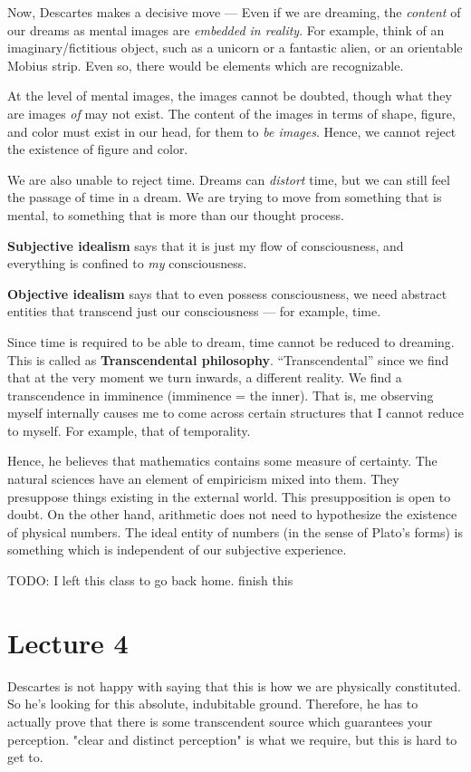 \documentclass[11pt]{book}
\begin{document}
Now, Descartes makes a decisive move --- Even if we are dreaming,
the \textit{content} of our dreams as mental images are
\textit{embedded in reality}.
For example, think of an imaginary/fictitious object, such
as a unicorn or a fantastic alien, or an orientable Mobius strip.
Even so, there would be elements which are recognizable.

At the level of mental images, the images cannot be doubted, though
what they are images \textit{of} may not exist. The content
of the images in terms of shape, figure, and color must exist in our head,
for them to \textit{be images}. Hence, we cannot reject the existence
of figure and color.

We are also unable to reject time. Dreams can \textit{distort} time, but
we can still feel the passage of time in a dream. We are trying to move
from something that is mental, to something that is more than our thought
process.

\textbf{Subjective idealism} says that it is just my flow of consciousness,
and everything is confined to \textit{my} consciousness.

\textbf{Objective idealism} says that to even possess consciousness, we need
abstract entities that transcend just our consciousness --- for example,
time.

Since time is required to be able to dream, time cannot be reduced
to dreaming. This is called as \textbf{Transcendental philosophy}.
``Transcendental'' since we find that at the very moment we
turn inwards, a different reality. We find a transcendence in
imminence (imminence = the inner). That is, me observing
myself internally causes me to come across certain structures that
I cannot reduce to myself. For example, that of temporality.

Hence, he believes that mathematics contains some measure of
certainty. The natural sciences have an element of empiricism
mixed into them. They presuppose things existing in the external
world. This presupposition is open to doubt. On the other hand,
arithmetic does not need to hypothesize the existence of
physical numbers. The ideal entity of numbers (in the sense of Plato's forms)
is something which is independent of our subjective experience.

TODO: I left this class to go back home. finish this

\chapter{Lecture 4}
Descartes is not happy with saying that this is how we are physically
constituted. So he's looking for this absolute, indubitable ground. Therefore,
he has to actually prove that there is some transcendent source which
guarantees your perception. "clear and distinct perception" is what we require,
but this is hard to get to.
\end{document}
